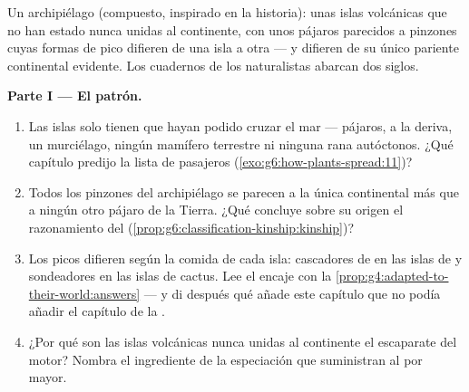 \begin{problem}\label{pb:g9:how-species-change:1}
Un archipiélago (compuesto, inspirado en la historia): unas islas
volcánicas que no han estado nunca unidas al continente, con unos
pájaros parecidos a pinzones cuyas formas de pico difieren de una isla
a otra --- y difieren de su único pariente continental evidente. Los
cuadernos de los naturalistas abarcan dos siglos.

\medskip\noindent\textbf{Parte I --- El patrón.}
\begin{enumerate}
  \item Las islas solo tienen  que hayan podido cruzar el mar
        --- pájaros,  a la deriva, un murciélago, ningún
        mamífero terrestre ni ninguna rana autóctonos. ¿Qué capítulo
        predijo la lista de pasajeros
        (\cref{exo:g6:how-plants-spread:11})?
  \item Todos los pinzones del archipiélago se parecen a la única
         continental más que a ningún otro pájaro de la Tierra.
        ¿Qué concluye sobre su origen el razonamiento del 
        (\cref{prop:g6:classification-kinship:kinship})?
  \item Los picos difieren según la comida de cada isla: cascadores de
         en las islas de  y sondeadores en las islas de
        cactus. Lee el encaje con la
        \cref{prop:g4:adapted-to-their-world:answers} --- y di después
        qué añade este capítulo que no podía añadir el capítulo de la
        .
  \item ¿Por qué son las islas volcánicas nunca unidas al continente el
        escaparate del motor? Nombra el ingrediente de la especiación
        que suministran al por mayor.
\end{enumerate}


\end{problem}
